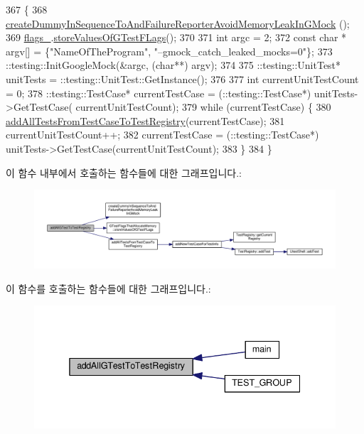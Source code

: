 \begin{DoxyCode}
367 \{
368     \hyperlink{class_g_test_convertor_aefacb5d39f829970a9288a5d3d6afb55}{createDummyInSequenceToAndFailureReporterAvoidMemoryLeakInGMock}
      ();
369     \hyperlink{class_g_test_convertor_a74ef936e2cd31159a036cf386411c9f1}{flags\_}.\hyperlink{class_g_test_flags_that_allocate_memory_abeb18e623ac60095ec42f4d94d43cc8a}{storeValuesOfGTestFLags}();
370 
371     \textcolor{keywordtype}{int} argc = 2;
372     \textcolor{keyword}{const} \textcolor{keywordtype}{char} * argv[] = \{\textcolor{stringliteral}{"NameOfTheProgram"}, \textcolor{stringliteral}{"--gmock\_catch\_leaked\_mocks=0"}\};
373     ::testing::InitGoogleMock(&argc, (\textcolor{keywordtype}{char}**) argv);
374 
375     ::testing::UnitTest* unitTests = ::testing::UnitTest::GetInstance();
376 
377     \textcolor{keywordtype}{int} currentUnitTestCount = 0;
378     ::testing::TestCase* currentTestCase = (::testing::TestCase*) unitTests->GetTestCase(
      currentUnitTestCount);
379     \textcolor{keywordflow}{while} (currentTestCase) \{
380         \hyperlink{class_g_test_convertor_a802fe3256fea081bee7e5d03c4b6343c}{addAllTestsFromTestCaseToTestRegistry}(currentTestCase);
381         currentUnitTestCount++;
382         currentTestCase = (::testing::TestCase*) unitTests->GetTestCase(currentUnitTestCount);
383     \}
384 \}
\end{DoxyCode}


이 함수 내부에서 호출하는 함수들에 대한 그래프입니다.\+:
\nopagebreak
\begin{figure}[H]
\begin{center}
\leavevmode
\includegraphics[width=350pt]{class_g_test_convertor_ab2d85457cc006bc2548ab982d0d27f55_cgraph}
\end{center}
\end{figure}




이 함수를 호출하는 함수들에 대한 그래프입니다.\+:
\nopagebreak
\begin{figure}[H]
\begin{center}
\leavevmode
\includegraphics[width=338pt]{class_g_test_convertor_ab2d85457cc006bc2548ab982d0d27f55_icgraph}
\end{center}
\end{figure}


